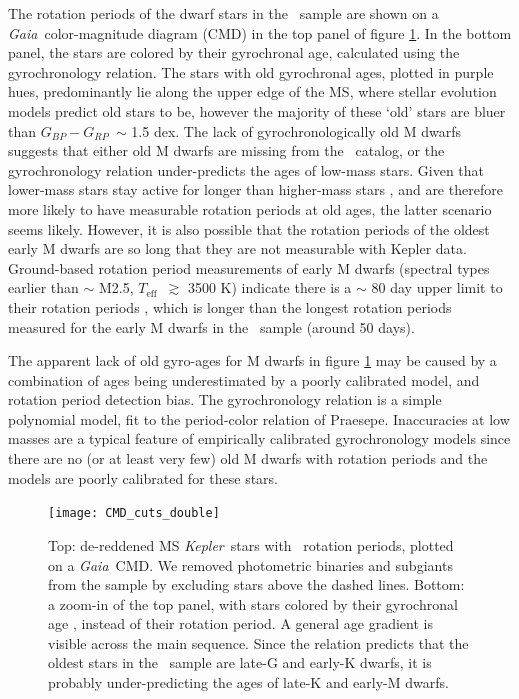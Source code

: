 \documentclass{aastex63}
\newcommand{\eg}{{\it e.g.}}
\newcommand{\kepler}{{\it Kepler}}
\newcommand{\gaia}{{\it Gaia}}
\newcommand{\teff}{$T_{\mathrm{eff}}$}
\newcommand{\gcolor}{$G_{BP} - G_{RP}$}
\newcommand{\mct}{\citet{mcquillan2014}}
\newcommand{\racomment}[1]{{\color{black}#1}}
\begin{document}
The rotation periods of the dwarf stars in the \mct\ sample are shown on a
\gaia\ color-magnitude diagram (CMD) in the top panel of figure
\ref{fig:age_gradient}.
In the bottom panel, the stars are colored by their gyrochronal age,
calculated using the \citet{angus2019} gyrochronology relation.
The stars with old gyrochronal ages, plotted in purple hues, predominantly lie
along the upper edge of the MS, where stellar evolution models predict old
stars to be, however the majority of these `old' stars are bluer than \gcolor\
$\sim$ 1.5 dex.
The lack of gyrochronologically old M dwarfs suggests that either old M dwarfs
are missing from the \mct\ catalog, or the \citet{angus2019} gyrochronology
relation under-predicts the ages of low-mass stars.
Given that lower-mass stars stay active for longer than higher-mass stars
\citep[\eg][]{west2008, newton2017, kiman2019}, and are therefore more likely
to have measurable rotation periods at old ages, the latter scenario seems
likely.
However, it is also possible that the rotation periods of the oldest early M
dwarfs are so long that they are not measurable with Kepler data.
\racomment{Ground-based rotation period measurements of early M dwarfs
(spectral types earlier than $\sim$ M2.5, \teff\ $\gtrsim$ 3500 K) indicate
there is a $\sim$ 80 day upper limit to their rotation periods
\citep{newton2016, newton2018}, which is longer than the longest rotation
periods measured for the early M dwarfs in the \mct\ sample (around 50 days).
}

The apparent lack of old gyro-ages for M dwarfs in figure
\ref{fig:age_gradient} may be caused by a combination of ages being
underestimated by a poorly calibrated model, and rotation period detection
bias.
The \citet{angus2019} gyrochronology relation is a simple polynomial model,
fit to the period-color relation of Praesepe.
Inaccuracies at low masses are a typical feature of empirically calibrated
gyrochronology models since there are no (or at least very few) old M dwarfs
with rotation periods and the models are poorly calibrated for these stars.
\begin{figure}
  \caption{
      Top: de-reddened MS \kepler\ stars with \mct\ rotation periods, plotted
    on a \gaia\ CMD.
    We removed photometric binaries and subgiants from the sample by excluding
    stars above the dashed lines.
    Bottom: a zoom-in of the top panel, with stars colored by their
    gyrochronal age \citep{angus2019}, instead of their rotation period.
    A general age gradient is visible across the main sequence.
    Since the \citet{angus2019} relation predicts that the oldest stars in
    the \mct\ sample are late-G and early-K dwarfs, it is probably
    under-predicting the ages of late-K and early-M dwarfs.
}
  \centering
    \texttt{[image: CMD\_cuts\_double]}
\label{fig:age_gradient}
\end{figure}
\end{document}
